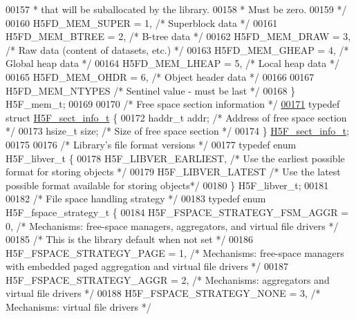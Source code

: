 \begin{DoxyCode}
00157 \textcolor{comment}{                                 * that will be suballocated by the library.}
00158 \textcolor{comment}{                                 * Must be zero.}
00159 \textcolor{comment}{                                 */}
00160     H5FD\_MEM\_SUPER      = 1,    \textcolor{comment}{/* Superblock data */}
00161     H5FD\_MEM\_BTREE      = 2,    \textcolor{comment}{/* B-tree data */}
00162     H5FD\_MEM\_DRAW       = 3,    \textcolor{comment}{/* Raw data (content of datasets, etc.) */}
00163     H5FD\_MEM\_GHEAP      = 4,    \textcolor{comment}{/* Global heap data */}
00164     H5FD\_MEM\_LHEAP      = 5,    \textcolor{comment}{/* Local heap data */}
00165     H5FD\_MEM\_OHDR       = 6,    \textcolor{comment}{/* Object header data */}
00166 
00167     H5FD\_MEM\_NTYPES             \textcolor{comment}{/* Sentinel value - must be last */}
00168 \} H5F\_mem\_t;
00169 
00170 \textcolor{comment}{/* Free space section information */}
\hyperlink{struct_h5_f__sect__info__t}{00171} \textcolor{keyword}{typedef} \textcolor{keyword}{struct }\hyperlink{struct_h5_f__sect__info__t}{H5F\_sect\_info\_t} \{
00172     haddr\_t             addr;   \textcolor{comment}{/* Address of free space section */}
00173     hsize\_t             size;   \textcolor{comment}{/* Size of free space section */}
00174 \} \hyperlink{struct_h5_f__sect__info__t}{H5F\_sect\_info\_t};
00175 
00176 \textcolor{comment}{/* Library's file format versions */}
00177 \textcolor{keyword}{typedef} \textcolor{keyword}{enum} H5F\_libver\_t \{
00178     H5F\_LIBVER\_EARLIEST,        \textcolor{comment}{/* Use the earliest possible format for storing objects */}
00179     H5F\_LIBVER\_LATEST           \textcolor{comment}{/* Use the latest possible format available for storing objects*/}
00180 \} H5F\_libver\_t;
00181 
00182 \textcolor{comment}{/* File space handling strategy */}
00183 \textcolor{keyword}{typedef} \textcolor{keyword}{enum} H5F\_fspace\_strategy\_t \{
00184     H5F\_FSPACE\_STRATEGY\_FSM\_AGGR = 0,   \textcolor{comment}{/* Mechanisms: free-space managers, aggregators, and virtual file
       drivers */}
00185                                         \textcolor{comment}{/* This is the library default when not set */}
00186     H5F\_FSPACE\_STRATEGY\_PAGE = 1,   \textcolor{comment}{/* Mechanisms: free-space managers with embedded paged aggregation and
       virtual file drivers */}
00187     H5F\_FSPACE\_STRATEGY\_AGGR = 2,   \textcolor{comment}{/* Mechanisms: aggregators and virtual file drivers */}
00188     H5F\_FSPACE\_STRATEGY\_NONE = 3,   \textcolor{comment}{/* Mechanisms: virtual file drivers */}

\end{DoxyCode}
